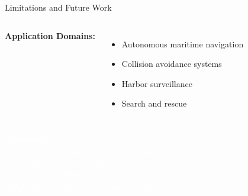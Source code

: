 \documentclass[aspectratio=169, 10pt]{beamer}
\begin{document}
\begin{frame}{Limitations and Future Work}
\begin{columns}[T]
\vspace{0.15cm}
\textbf{Application Domains:}
\begin{itemize}
  \setlength{\itemsep}{0pt}
  \item Autonomous maritime navigation
  \item Collision avoidance systems
  \item Harbor surveillance
  \item Search and rescue
\end{itemize}
\end{columns}
\end{frame}

{
\begin{frame}
\vfill
\centering
{\Huge\textcolor{white}{\textbf{Questions?}}}\\[1.5cm]
{\large\textcolor{white}{S. Cancilla, J.C. Vaught, D. Cahl, Y. Wang}}\\[0.3cm]
{\large\textcolor{white}{University of South Carolina}}\\[0.2cm]
{\large\textcolor{white}{Columbia, SC 29208}}\\[1.5cm]
{\normalsize\textcolor{white}{AIAA Region II Student Conference 2026}}
\vfill
\end{frame}
}
\end{document}
